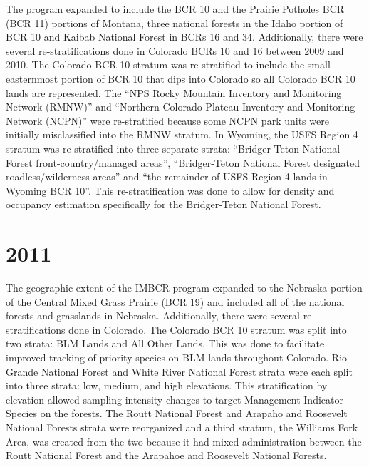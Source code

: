 \documentclass[
  letterpaper,
  DIV=11,
  numbers=noendperiod,
  oneside]{scrreprt}
\begin{document}

The program expanded to include the BCR 10 and the Prairie Potholes BCR
(BCR 11) portions of Montana, three national forests in the Idaho
portion of BCR 10 and Kaibab National Forest in BCRs 16 and 34.
Additionally, there were several re-stratifications done in Colorado
BCRs 10 and 16 between 2009 and 2010. The Colorado BCR 10 stratum was
re-stratified to include the small easternmost portion of BCR 10 that
dips into Colorado so all Colorado BCR 10 lands are represented. The
``NPS Rocky Mountain Inventory and Monitoring Network (RMNW)'' and
``Northern Colorado Plateau Inventory and Monitoring Network (NCPN)''
were re-stratified because some NCPN park units were initially
misclassified into the RMNW stratum. In Wyoming, the USFS Region 4
stratum was re-stratified into three separate strata: ``Bridger-Teton
National Forest front-country/managed areas'', ``Bridger-Teton National
Forest designated roadless/wilderness areas'' and ``the remainder of
USFS Region 4 lands in Wyoming BCR 10''. This re-stratification was done
to allow for density and occupancy estimation specifically for the
Bridger-Teton National Forest.

\hypertarget{section-2}{%
\section*{\texorpdfstring{\textbf{2011}}{2011}}\label{section-2}}


The geographic extent of the IMBCR program expanded to the Nebraska
portion of the Central Mixed Grass Prairie (BCR 19) and included all of
the national forests and grasslands in Nebraska. Additionally, there
were several re-stratifications done in Colorado. The Colorado BCR 10
stratum was split into two strata: BLM Lands and All Other Lands. This
was done to facilitate improved tracking of priority species on BLM
lands throughout Colorado. Rio Grande National Forest and White River
National Forest strata were each split into three strata: low, medium,
and high elevations. This stratification by elevation allowed sampling
intensity changes to target Management Indicator Species on the forests.
The Routt National Forest and Arapaho and Roosevelt National Forests
strata were reorganized and a third stratum, the Williams Fork Area, was
created from the two because it had mixed administration between the
Routt National Forest and the Arapahoe and Roosevelt National Forests.
\end{document}
